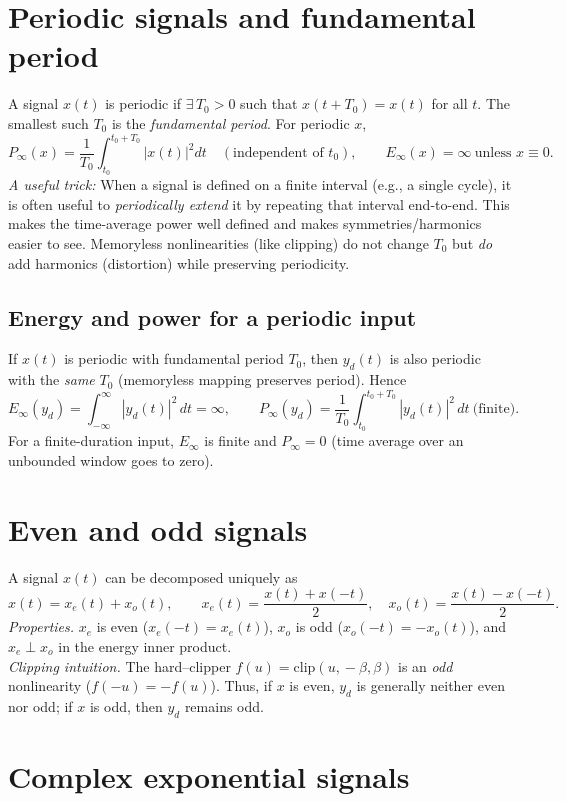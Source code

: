 \documentclass{ee102_notes}
\begin{document}
\section{Periodic signals and fundamental period}
A signal $x(t)$ is periodic if $\exists\,T_0>0$ such that $x(t+T_0)=x(t)$ for all $t$. The smallest such $T_0$ is the \emph{fundamental period}. For periodic $x$,
\[
P_\infty(x)=\frac{1}{T_0}\!\int_{t_0}^{t_0+T_0}\!|x(t)|^2 dt
\quad(\text{independent of }t_0),\qquad
E_\infty(x)=\infty\ \text{unless }x\equiv 0.
\]
\textit{A useful trick:} When a signal is defined on a finite interval (e.g., a single cycle), it is often useful to \emph{periodically extend} it by repeating that interval end-to-end. This makes the time-average power well defined and makes symmetries/harmonics easier to see. Memoryless nonlinearities (like clipping) do not change $T_0$ but \emph{do} add harmonics (distortion) while preserving periodicity.

\subsection*{Energy and power for a periodic input}
If $x(t)$ is periodic with fundamental period $T_0$, then $y_d(t)$ is also periodic with the \emph{same} $T_0$ (memoryless mapping preserves period). Hence
\[
E_\infty(y_d)=\int_{-\infty}^{\infty}\!|y_d(t)|^2\,dt=\infty,\qquad
P_\infty(y_d)=\frac{1}{T_0}\int_{t_0}^{t_0+T_0}\!|y_d(t)|^2\,dt\ \text{(finite)}.
\]
For a finite-duration input, $E_\infty$ is finite and $P_\infty=0$ (time average over an unbounded window goes to zero).

\section{Even and odd signals}
A signal $x(t)$ can be decomposed uniquely as
\[
x(t)=x_e(t)+x_o(t),\qquad
x_e(t)=\frac{x(t)+x(-t)}{2},\quad
x_o(t)=\frac{x(t)-x(-t)}{2}.
\]
\textit{Properties.} $x_e$ is even ($x_e(-t)=x_e(t)$), $x_o$ is odd ($x_o(-t)=-x_o(t)$), and $x_e\perp x_o$ in the energy inner product.\\
\textit{Clipping intuition.} The hard–clipper $f(u)=\mathrm{clip}(u,\!-\beta,\beta)$ is an \emph{odd} nonlinearity ($f(-u)=-f(u)$). Thus, if $x$ is even, $y_d$ is generally neither even nor odd; if $x$ is odd, then $y_d$ remains odd.

\section{Complex exponential signals}
\end{document}
